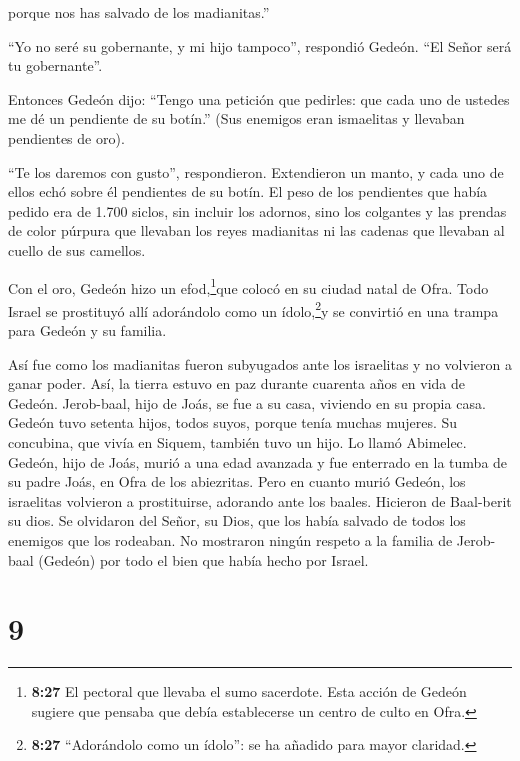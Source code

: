  porque nos has salvado de los madianitas.''

 ``Yo no seré su gobernante, y mi hijo tampoco'', respondió
Gedeón. ``El Señor será tu gobernante''.

 Entonces Gedeón dijo: ``Tengo una petición que pedirles:
que cada uno de ustedes me dé un pendiente de su botín.'' (Sus enemigos
eran ismaelitas y llevaban pendientes de oro).

 ``Te los daremos con gusto'', respondieron. Extendieron un
manto, y cada uno de ellos echó sobre él pendientes de su botín.
 El peso de los pendientes que había pedido era de 1.700
siclos, sin incluir los adornos, sino los colgantes y las prendas de
color púrpura que llevaban los reyes madianitas ni las cadenas que
llevaban al cuello de sus camellos.

 Con el oro, Gedeón hizo un efod,\footnote{\textbf{8:27} El
  pectoral que llevaba el sumo sacerdote. Esta acción de Gedeón sugiere
  que pensaba que debía establecerse un centro de culto en Ofra.}que
colocó en su ciudad natal de Ofra. Todo Israel se prostituyó allí
adorándolo como un ídolo,\footnote{\textbf{8:27} ``Adorándolo como un
  ídolo'': se ha añadido para mayor claridad.}y se convirtió en una
trampa para Gedeón y su familia.

 Así fue como los madianitas fueron subyugados ante los
israelitas y no volvieron a ganar poder. Así, la tierra estuvo en paz
durante cuarenta años en vida de Gedeón.  Jerob-baal, hijo
de Joás, se fue a su casa, viviendo en su propia casa. 
Gedeón tuvo setenta hijos, todos suyos, porque tenía muchas mujeres.
 Su concubina, que vivía en Siquem, también tuvo un hijo.
Lo llamó Abimelec.  Gedeón, hijo de Joás, murió a una edad
avanzada y fue enterrado en la tumba de su padre Joás, en Ofra de los
abiezritas.  Pero en cuanto murió Gedeón, los israelitas
volvieron a prostituirse, adorando ante los baales. Hicieron de
Baal-berit su dios.  Se olvidaron del Señor, su Dios, que
los había salvado de todos los enemigos que los rodeaban. 
No mostraron ningún respeto a la familia de Jerob-baal (Gedeón) por todo
el bien que había hecho por Israel.

\hypertarget{section-8}{%
\section{9}\label{section-8}}

